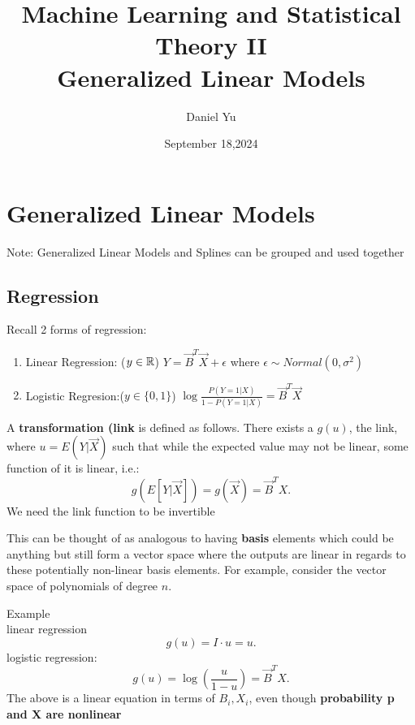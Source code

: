 \documentclass[a4paper]{article}
\title{\Huge{Machine Learning and Statistical Theory II}\\ Generalized Linear Models}
\author{\huge{Daniel Yu}}
\date{September 18,2024}
\begin{document}
\maketitle
\newpage%
\tableofcontents
\pagebreak
\section{Generalized Linear Models}
Note: Generalized Linear Models and Splines can be grouped and used together

\subsection{Regression}
Recall 2 forms of regression:
\begin{enumerate}
  \item Linear Regression: ($y \in \mathbb{R}$) $Y = \vec{B}^T \vec{X} + \epsilon$ where  $\epsilon \sim Normal\left( 0, \sigma^2 \right) $
  \item Logistic Regresion:($y \in \{0,1\} $) $\log \frac{P(Y=1 | X)}{1-P(Y=1| X)} = \vec{B}^T \vec{X}$
\end{enumerate}

\begin{definition}
  A \textbf{transformation (link} is defined as follows. There exists a $g(u)$, the link, where $u = E(Y | \vec{X})$ such that
  while the expected value may not be linear, some function of it is linear, i.e.:
   \[
     g(E[Y| \vec{X}]) = g(\vec{X}) = \vec{B}^T X 
  .\] 
  We need the link function to be invertible
\end{definition}

\begin{remark}
  This can be thought of as analogous to having \textbf{basis} elements which could be anything but still form a 
  vector space where the outputs are linear in regards to these potentially non-linear basis elements. 
  For example, consider the vector space of polynomials of degree $n$. 
\end{remark}

\begin{note}{Example} \\
  linear regression
  \[
  g(u) = I \cdot u = u
  .\] 
  logistic regression:
  \[
    g(u) = \log(\frac{u}{1-u}) = \vec{B}^T X 
  .\] 
  The above is a linear equation in terms of $B_i, X_i$, even though \textbf{probability p and X are nonlinear} 
\end{note}
\end{document}
